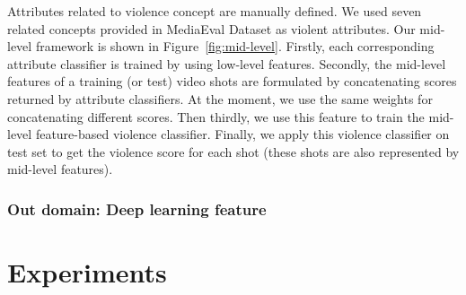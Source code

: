 \documentclass[review]{elsarticle}
\begin{document}
Attributes related to violence concept are manually defined. We used seven related concepts provided in MediaEval Dataset as violent attributes. Our mid-level framework is shown in Figure~\ref{fig:mid-level}. Firstly, each corresponding attribute classifier is trained by using low-level features. Secondly, the mid-level features of a training (or test) video shots are formulated by concatenating scores returned by attribute classifiers. At the moment, we use the same weights for concatenating different scores. Then thirdly, we use this feature to train the mid-level feature-based violence classifier.  Finally, we apply this violence classifier on test set to get the violence score for each shot (these shots are also represented by mid-level features).

\subsubsection{Out domain: Deep learning feature}

\section{Experiments}
\end{document}
